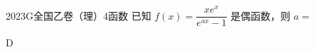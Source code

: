 
\begin{problem}{2023}{G}{全国乙卷（理）}{4}{函数}
已知 $ f(x) = \dfrac{x e^x}{e^{a x} - 1} $ 是偶函数，则 $ a = $
\begin{choices}
\end{choices}
\end{problem}

\begin{answer}
D
\end{answer}

\begin{solutions}

\end{solutions}